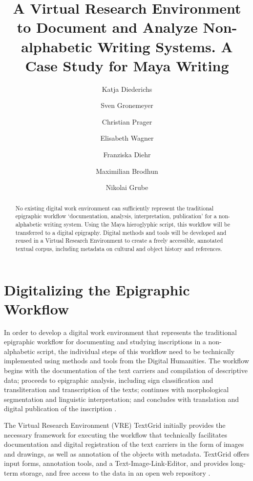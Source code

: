 \documentclass[amsthm,ebook]{saparticle}
\title{A Virtual Research Environment to 
Document and Analyze Non-alphabetic Writing Systems. 
A Case Study for Maya Writing}
\author[BONN]{Katja Diederichs\corref{first}}
\author[BONN,MEL]{Sven Gronemeyer}
\author[BONN]{Christian Prager}
\author[BONN]{Elisabeth Wagner}
\author[GOT]{Franziska Diehr}
\author[GOT]{Maximilian Brodhun}
\author[BONN]{Nikolai Grube}
\begin{document}
\maketitle

\begin{abstract}
No existing digital work environment can sufficiently represent the traditional epigraphic workflow `documentation,
analysis, interpretation, publication' for a non-alphabetic writing system. Using the Maya hieroglyphic script, this
workflow will be transferred to a digital epigraphy. Digital methods and tools will be developed and reused in a
Virtual Research Environment to create a freely accessible, annotated textual corpus, including metadata on cultural
and object history and references.
\end{abstract}







\section{Digitalizing the Epigraphic Workflow}


\noindent In order to develop a digital work environment that represents the traditional epigraphic workflow for documenting and
studying inscriptions in a non-alphabetic script, the individual steps of this workflow need to be technically
implemented using methods and tools from the Digital Humanities. The workflow begins with the documentation of the text
carriers and compilation of descriptive data; proceeds to epigraphic analysis, including sign classification and
transliteration and transcription of the texts; continues with morphological segmentation and linguistic
interpretation; and concludes with translation and digital publication of the inscription \citep{Diederichs2015}. 

The Virtual Research Environment (VRE) TextGrid initially provides the necessary framework for executing the workflow
that technically facilitates documentation and digital registration of the text carriers in the form of images and
drawings, as well as annotation of the objects with metadata. TextGrid offers input forms, annotation tools, and a
Text-Image-Link-Editor, and provides long-term storage, and free access to the data in an open web repository \citep{NeurothLohmeier2011}. 
\end{document}
